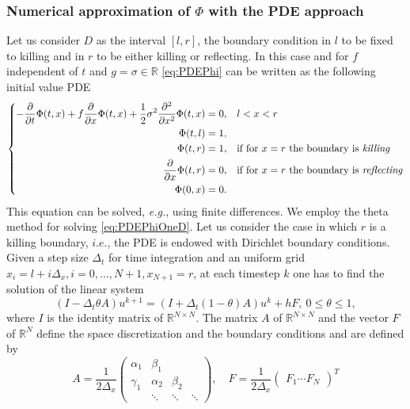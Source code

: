 \subsubsection{Numerical approximation of $\Phi$ with the PDE approach}

Let us consider $D$ as the interval $\left[ l,r \right]$, the boundary condition in $l$ to be fixed to killing and in $r$ to be either killing or reflecting. In this case and for $f$ independent of $t$ and $g = \sigma \in \mathbb{R}$ \eqref{eq:PDEPhi} can be written as the following initial value PDE 
\begin{equation}\label{eq:PDEPhiOneD}
\left \{
\begin{aligned}
	-\frac{\partial}{\partial t} \Phi(t,x) + f\frac{\partial}{\partial x} \Phi(t,x) + \frac{1}{2}\sigma^2 \frac{\partial^2}{\partial x^2} \Phi(t,x) &= 0, && l < x < r \\
	\Phi(t,l) &= 1, \\
	\Phi(t,r) &= 1, && \text{if for $x = r$ the boundary is \textit{killing}} \\
	\frac{\partial}{\partial x}\Phi(t,r) &= 0, && \text{if for $x = r$ the boundary is \textit{reflecting}} \\
	\Phi(0,x) &= 0.
\end{aligned} \right .
\end{equation}
This equation can be solved, \textit{e.g.}, using finite differences. We employ the theta method for solving \eqref{eq:PDEPhiOneD}. Let us consider the case in which $r$ is a killing boundary, $i.e.$, the PDE is endowed with Dirichlet boundary conditions. Given a step size $\Delta_t$ for time integration and an uniform grid $x_i = l + i\Delta_x, i=0,\dots,N+1, x_{N+1} = r$, at each timestep $k$ one has to find the solution of the linear system
\begin{equation}\label{eq:ThetaMethod}
	(I - \Delta_t\theta A) u^{k+1} = (I + \Delta_t(1-\theta) A)u^k + hF, \: 0 \leq \theta \leq 1,
\end{equation}
where $I$ is the identity matrix of $\mathbb{R}^{N\times N}$. The matrix $A$ of $\mathbb{R}^{N\times N}$ and the vector $F$ of $\mathbb{R}^N$ define the space discretization and the boundary conditions and are defined by
\begin{equation}\label{eq:ThetaMethodAandF}
	A = \frac{1}{2\Delta_x}\begin{pmatrix} 	\alpha_1 & \beta_1  &  	      &\\
						\gamma_1 & \alpha_2 & \beta_2 &\\
							 & \ddots   & \ddots  & \ddots \end{pmatrix}, \quad F = \frac{1}{2\Delta_x}\begin{pmatrix} F_1 \cdots F_N \end{pmatrix}^T
\end{equation}
